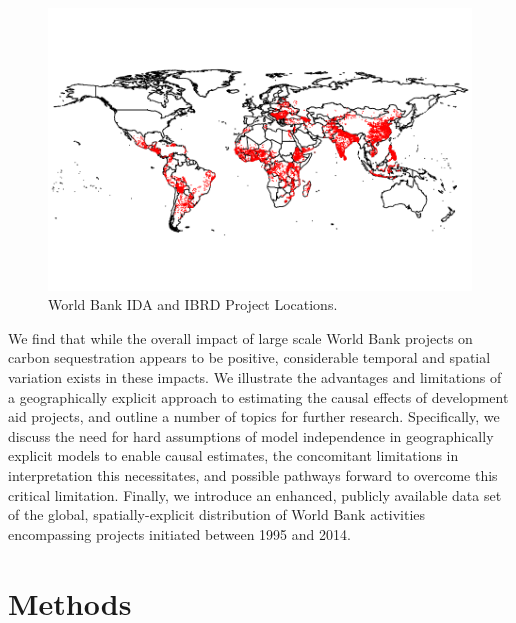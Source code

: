 \documentclass{article}\usepackage[]{graphicx}\usepackage[]{color}
\makeatletter
\def\maxwidth{ %
  \ifdim\Gin@nat@width>\linewidth
    \linewidth
  \else
    \Gin@nat@width
  \fi
}
\newenvironment{knitrout}{}{}  %
\makeatother
\begin{document}
\begin{knitrout}
\begin{figure}
\begin{Schunk}
\includegraphics[width=\maxwidth]{figure/WLocs-1} \end{Schunk}
\caption{World Bank IDA and IBRD Project Locations.}
\label{WBLocs}
\vspace{25pt}
\end{figure}  

We find that while the overall impact of large scale World Bank projects on carbon sequestration appears to be positive, considerable temporal and spatial variation exists in these impacts.
We illustrate the advantages and limitations of a geographically explicit approach to estimating the causal effects of development aid projects, and outline a number of topics for further research.
Specifically, we discuss the need for hard assumptions of model independence in geographically explicit models to enable causal estimates, the concomitant limitations in interpretation this necessitates, and possible pathways forward to overcome this critical limitation.
Finally, we introduce an enhanced, publicly available data set of the global, spatially-explicit distribution of World Bank activities encompassing projects initiated between 1995 and 2014.

\newpage
\section{Methods}


\end{knitrout}
\end{document}
